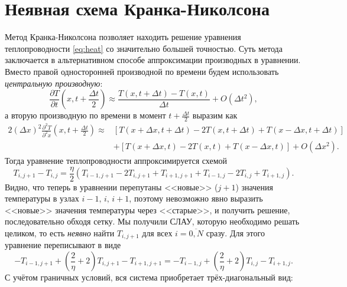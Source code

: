 \documentclass[12pt]{article}
\begin{document}
\section*{Неявная схема Кранка-Николсона}
Метод Кранка-Николсона позволяет находить решение уравнения теплопроводности \eqref{eq:heat} со значительно большей точностью. Суть метода заключается в альтернативном способе аппроксимации производных в уравнении. Вместо правой односторонней производной по времени будем использовать \textit{центральную производную}:
%
\begin{equation}
\frac{\partial T}{\partial t}\left(x,t+\frac{\Delta t}{2}\right)\approx \frac{T(x,t+\Delta t)-T(x,t)}{\Delta t}+O(\Delta t^2),
\end{equation}
%
а вторую производную по времени в момент $t+\frac{\Delta t}{2}$ выразим как
%
\begin{equation}
\begin{split}
2(\Delta x)^2\frac{\partial^2 T}{\partial^2 x}\left(x,t+\frac{\Delta t}{2}\right)\approx & \left[T(x+\Delta x,t+\Delta t)-2T(x,t+\Delta t)+T(x-\Delta x, t+\Delta t)\right]\\
& + \left[T(x+\Delta x,t)-2T(x,t)+T(x-\Delta x, t)\right]+O(\Delta x^2).
\end{split}
\end{equation}
%
Тогда уравнение теплопроводности аппроксимируется схемой
%
\begin{equation}
T_{i,j+1}-T_{i,j}=\frac{\eta}{2}\left(T_{i-1,j+1}-2T_{i,j+1}+T_{i+1,j+1}+T_{i-1,j}-2T_{i,j}+T_{i+1,j}\right).
\end{equation}
%
Видно, что теперь в уравнении перепутаны <<новые>> ($j+1$) значения температуры в узлах $i-1,\,i,\,i+1$, поэтому невозможно явно выразить <<новые>> значения температуры через <<старые>>, и получить решение, последовательно обходя сетку. Мы получили СЛАУ, которую необходимо решать целиком, то есть \textit{неявно} найти $T_{i,j+1}$ для всех $i=\overline{0,N}$ сразу. Для этого уравнение переписывают в виде
%
\begin{equation}
-T_{i-1,j+1}+\left(\frac{2}{\eta}+2\right)T_{i,j+1}-T_{i+1,j+1}=-T_{i-1,j}+\left(\frac{2}{\eta}+2\right)T_{i,j}-T_{i+1,j}.
\end{equation}
%
С учётом граничных условий, вся система приобретает трёх-диагональный вид:
%
\end{document}
